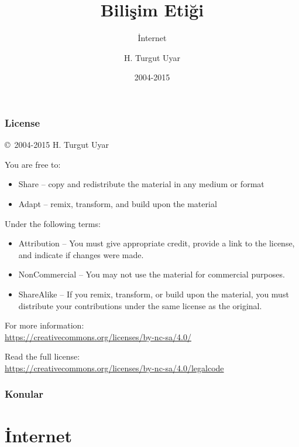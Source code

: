 \documentclass[dvipsnames]{beamer}
\title{Bilişim Etiği}
\subtitle{İnternet}
\author{H. Turgut Uyar}
\date{2004-2015}
\theoremstyle{plain}
\begin{document}
\begin{frame}
  \titlepage
\end{frame}

\begin{frame}
  \frametitle{License}

  \hfill
  \copyright~2004-2015 H. Turgut Uyar

  \vfill
  \begin{footnotesize}
    You are free to:
    \begin{itemize}
      \itemsep0em
      \item Share -- copy and redistribute the material in any medium or format
      \item Adapt -- remix, transform, and build upon the material
    \end{itemize}

    Under the following terms:
    \begin{itemize}
      \itemsep0em
      \item Attribution -- You must give appropriate credit, provide a link to
        the license, and indicate if changes were made.

      \item NonCommercial -- You may not use the material for commercial
        purposes.

      \item ShareAlike -- If you remix, transform, or build upon the material,
        you must distribute your contributions under the same license as the
        original.
    \end{itemize}
  \end{footnotesize}

  \begin{small}
    For more information:\\
    \url{https://creativecommons.org/licenses/by-nc-sa/4.0/}

    \smallskip
    Read the full license:\\
    \url{https://creativecommons.org/licenses/by-nc-sa/4.0/legalcode}
  \end{small}
\end{frame}

\begin{frame}
  \frametitle{Konular}
  \tableofcontents
\end{frame}

\section{İnternet}
\end{document}
